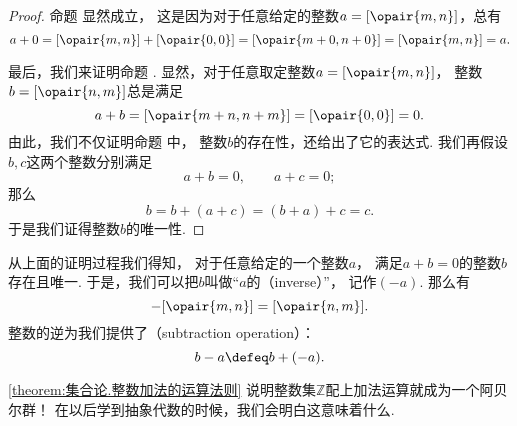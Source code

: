 \begin{theorem}
\begin{proof}
命题  显然成立，
这是因为对于任意给定的整数\(a = [\opair{m,n}]\)，总有\begin{equation*}
	a+0
	= [\opair{m,n}]+[\opair{0,0}]
	= [\opair{m+0,n+0}]
	= [\opair{m,n}]
	= a.
\end{equation*}

最后，我们来证明命题 .
显然，对于任意取定整数\(a = [\opair{m,n}]\)，
整数\(b = [\opair{n,m}]\)总是满足\begin{equation*}
	a+b
	= [\opair{m+n,n+m}]
	= [\opair{0,0}]
	= 0.
\end{equation*}
由此，我们不仅证明命题  中，
整数\(b\)的存在性，还给出了它的表达式.
我们再假设\(b,c\)这两个整数分别满足\begin{equation*}
	a+b=0, \qquad
	a+c=0;
\end{equation*}
那么\begin{equation*}
	b=b+(a+c)=(b+a)+c=c.
\end{equation*}
于是我们证得整数\(b\)的唯一性.
\end{proof}
\end{theorem}

从上面的证明过程我们得知，
对于任意给定的一个整数\(a\)，
满足\(a+b=0\)的整数\(b\)存在且唯一.
于是，我们可以把\(b\)叫做“\(a\)的（inverse）”，
记作\((-a)\).
那么有\begin{equation}
	-[\opair{m,n}]=[\opair{n,m}].
\end{equation}
整数的逆为我们提供了（subtraction operation）：
\begin{equation}
	b-a \defeq b+(-a).
\end{equation}

\cref{theorem:集合论.整数加法的运算法则}
说明整数集\(\mathbb{Z}\)配上加法运算就成为一个阿贝尔群！
在以后学到抽象代数的时候，我们会明白这意味着什么.

